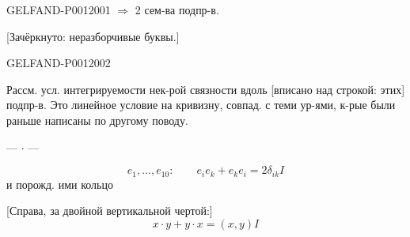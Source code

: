 \begin{GelfandAdjacentEvidence}{GELFAND-P001200}{1}
$\Longrightarrow$ 2 сем-ва подпр-в.

[Зачёркнуто: неразборчивые буквы.]
\end{GelfandAdjacentEvidence}
\begin{GelfandAdjacentEvidence}{GELFAND-P001200}{2}

Рассм. усл. интегрируемости нек-рой связности вдоль [вписано над строкой: этих] подпр-в. Это линейное условие на кривизну, совпад. с теми ур-ями, к-рые были раньше написаны по другому поводу.

\begin{center}--- \(\cdot\) ---\end{center}

\[
e_1,\ldots,e_{10}:\qquad e_i e_k+e_k e_i=2\delta_{ik}I
\]
и порожд. ими кольцо

[Справа, за двойной вертикальной чертой:]
\[
x\cdot y+y\cdot x=(x,y)I
\]
\end{GelfandAdjacentEvidence}
